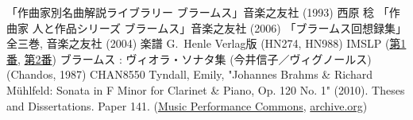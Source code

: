 
\begin{thebibliography}{99}
	 「作曲家別名曲解説ライブラリー ブラームス」音楽之友社 (1993)
	 西原 稔 「作曲家 人と作品シリーズ ブラームス」音楽之友社 (2006)
	 「ブラームス回想録集」全三巻, 音楽之友社 (2004)
	 楽譜 G.~Henle Verlag版 (HN274, HN988)
	 IMSLP (\href{http://imslp.org/wiki/Clarinet_Sonata_No.1,_Op.120_No.1_(Brahms,_Johannes)}{第1番},
		\href{http://imslp.org/wiki/Clarinet_Sonata_No.2,_Op.120_No.2_(Brahms,_Johannes)}{第2番})
	 ブラームス : ヴィオラ・ソナタ集 (今井信子／ヴィグノールス) (Chandos, 1987) CHAN8550
	 Tyndall, Emily, "Johannes Brahms \& Richard Mühlfeld: Sonata in F Minor for Clarinet \& Piano, Op. 120 No. 1" (2010). %
		Theses and Dissertations. Paper 141.
		(\href{http://csuepress.columbusstate.edu/cgi/viewcontent.cgi?article=1141&context=theses_dissertations}{Music Performance Commons},
		\href{https://archive.org/details/johannesbrahms00tynd}{archive.org})
\end{thebibliography}
